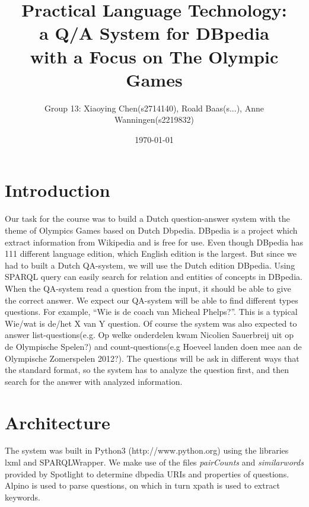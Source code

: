 \documentclass[a4paper,11pt]{article}
\title{ {\small Practical Language Technology:}\\{\Large a Q/A System for DBpedia}\\{\small with a Focus on The Olympic Games}}
\date{\today}
\author{
  {\small Group 13: }
  {\small Xiaoying Chen}{\tiny(s2714140)},
  {\small Roald Baas}{\tiny(s...)},
  {\small Anne Wanningen}{\tiny(s2219832)}
}
\begin{document}


\maketitle

\section{Introduction}
Our task for the course was to build a Dutch question-answer system with the theme of Olympics Games based on Dutch Dbpedia. DBpedia is a project which extract information from Wikipedia and is free for use. Even though DBpedia has 111 different language edition, which English edition is the largest. But since we had to built a Dutch QA-system, we will use the Dutch edition DBpedia. Using SPARQL query can easily search for relation and entities of concepts in DBpedia. When the QA-system read a question from the input, it should be able to give the correct answer. We expect our QA-system will be able to find different types questions. For example, “Wie is de coach van Micheal Phelps?”. This is a typical Wie/wat is de/het X van Y question. Of course the system was also expected to answer list-questions(e.g. Op welke onderdelen kwam Nicolien Sauerbreij uit op de Olympische Spelen?) and count-questions(e.g Hoeveel landen doen mee aan de Olympische Zomerspelen 2012?). The questions will be ask in different ways that the standard format, so the system has to analyze the question first, and then search for the answer with analyzed information.


\section{Architecture}
The system was built in Python3 (http://www.python.org) using the libraries lxml and SPARQLWrapper. We make use of the files \emph{pairCounts} and \emph{similarwords} provided by Spotlight \citep{isem2013daiber} to determine dbpedia URIs and properties of questions. Alpino is used to parse questions, on which in turn xpath is used to extract keywords.
\end{document}
